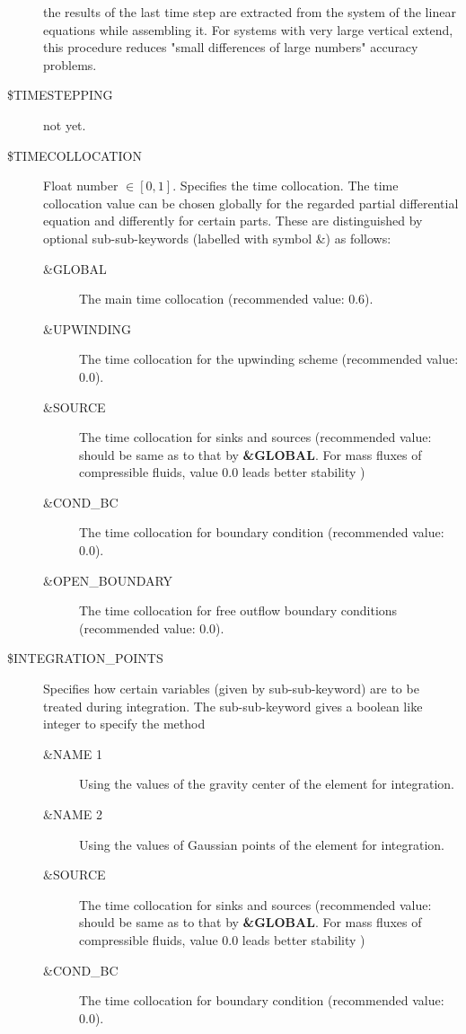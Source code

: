 \begin{description}
    the results of the last time step are extracted from the system of the linear equations while assembling it.
    For systems with very large vertical extend, this procedure reduces "small differences of large numbers" accuracy
    problems.
    \item[\$TIMESTEPPING] not yet.
    \item[\$TIMECOLLOCATION] Float number $\in [0,1]$. Specifies the time collocation. The time collocation value can be chosen globally for the
    regarded partial differential equation and differently for certain parts. These are distinguished by optional sub-sub-keywords
    (labelled with symbol \&) as follows:
    {
      \begin{description}
       \item [\&GLOBAL]The main time collocation (recommended value: 0.6).
       \item [\&UPWINDING] The time collocation for the upwinding scheme (recommended value: 0.0).
       \item [\&SOURCE]The time collocation for sinks and sources (recommended value: should be same as to that by
                       \textbf{\&GLOBAL}. For mass fluxes of compressible fluids, value 0.0 leads better stability )
       \item [\&COND\_BC]The time collocation for boundary condition (recommended value: 0.0).
       \item [\&OPEN\_BOUNDARY]The time collocation for free outflow boundary conditions (recommended value: 0.0).
      \end{description}
     }
   \item[\$INTEGRATION\_POINTS] Specifies how certain variables (given by sub-sub-keyword) are to be treated during
      integration. The sub-sub-keyword gives a boolean like integer to specify the method
    {
      \begin{description}
       \item [\&NAME 1] Using the values of the gravity center of the element for integration.
       \item [\&NAME 2] Using the values of Gaussian points of the element for integration.
       \item [\&SOURCE]The time collocation for sinks and sources (recommended value: should be same as to that by
                       \textbf{\&GLOBAL}. For mass fluxes of compressible fluids, value 0.0 leads better stability )
       \item [\&COND\_BC]The time collocation for boundary condition (recommended value: 0.0).

\end{description}}
\end{description}
